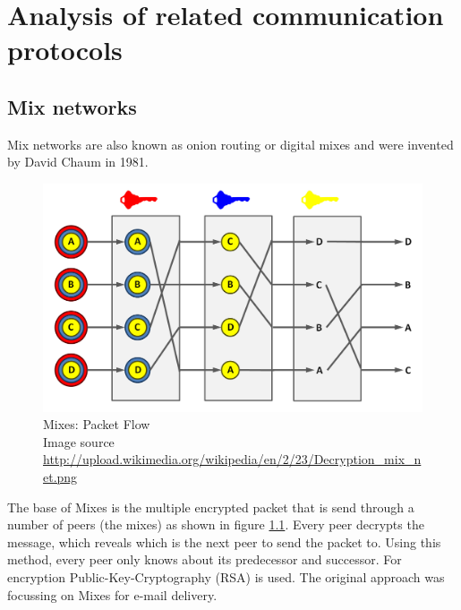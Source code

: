 \chapter{Analysis of related communication protocols}
\label{commprotocols}

\section{Mix networks}
Mix networks are also known as onion routing or digital mixes and
were invented by David Chaum in 1981.\cite{Chaum:1981:UEM:358549.358563}
\begin{figure}
    \centering
    \caption[Mixes: Packet Flow]{Mixes: Packet Flow\\Image source \url{http://upload.wikimedia.org/wikipedia/en/2/23/Decryption_mix_net.png}}
    \label{mixesflow}
    \includegraphics[scale=0.3]{Decryption_mix_net.png}
\end{figure}
The base of Mixes is the multiple encrypted packet that is send through a
number of peers (the mixes) as shown in figure \ref{mixesflow}.
Every peer decrypts the message, which reveals which is the next peer
to send the packet to. Using this method, every peer only knows about
its predecessor and successor. For encryption Public-Key-Cryptography (RSA) is used.
The original approach was focussing on Mixes for e-mail delivery.
